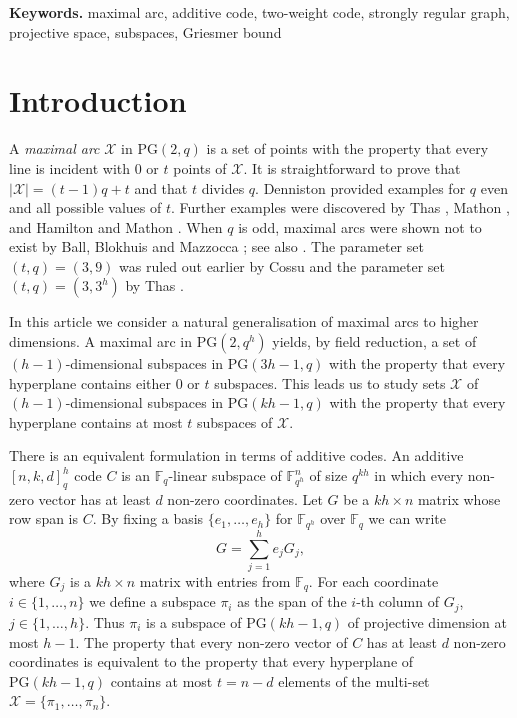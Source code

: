 \documentclass[12pt, twoside]{article}
\def\keywords#1{\par\medskip
	
	\noindent\textbf{Keywords.} #1}
\begin{document}
	\keywords{maximal arc, additive code, two-weight code, strongly regular graph, projective space, subspaces, Griesmer bound}
	
	\section{Introduction}
	
	A {\em maximal arc} $\mathcal{X}$ in $\mathrm{PG}(2,q)$ is a set of points with the property that every line is incident with $0$ or $t$ points of $\mathcal{X}$. It is straightforward to prove that $|\mathcal{X}|=(t-1)q+t$ and that $t$ divides $q$. Denniston \cite{den} provided examples for $q$ even and all possible values of $t$. Further examples were discovered by Thas \cite{tha1,tha3}, Mathon \cite{mathoncon}, and Hamilton and Mathon \cite{HM2003}. When $q$ is odd, maximal arcs were shown not to exist by Ball, Blokhuis and Mazzocca \cite{BBM}; see also \cite{BB}. The parameter set $(t,q)=(3,9)$ was ruled out earlier by Cossu \cite{cos} and the parameter set $(t,q)=(3,3^{h})$ by Thas \cite{tha}.
	
	In this article we consider a natural generalisation of maximal arcs to higher dimensions. A maximal arc in $\mathrm{PG}(2,q^h)$ yields, by field reduction, a set of $(h-1)$-dimensional subspaces in $\mathrm{PG}(3h-1,q)$ with the property that every hyperplane contains either $0$ or $t$ subspaces. This leads us to study sets $\mathcal{X}$ of $(h-1)$-dimensional subspaces in $\mathrm{PG}(kh-1,q)$ with the property that every hyperplane contains at most $t$ subspaces of $\mathcal{X}$.
	
	There is an equivalent formulation in terms of additive codes. An additive $[n,k,d]_{q}^h$ code $C$ is an $\mathbb{F}_q$-linear subspace of $\mathbb{F}_{q^h}^n$ of size $q^{kh}$ in which every non-zero vector has at least $d$ non-zero coordinates. Let $G$ be a $kh \times n$ matrix whose row span is $C$. By fixing a basis $\{e_1,\ldots,e_h\}$ for $\mathbb{F}_{q^h}$ over $\mathbb{F}_q$ we can write
	$$
	G=\sum_{j=1}^h e_jG_j,
	$$
	where $G_j$ is a $kh \times n$ matrix with entries from $\mathbb{F}_q$. For each coordinate $i \in \{1,\ldots,n\}$ we define a subspace $\pi_i$ as the span of the $i$-th column of $G_j$, $j \in \{1,\ldots,h\}$. Thus $\pi_i$ is a subspace of $\mathrm{PG}(kh-1,q)$ of projective dimension at most $h-1$. The property that every non-zero vector of $C$ has at least $d$ non-zero coordinates is equivalent to the property that every hyperplane of $\mathrm{PG}(kh-1,q)$ contains at most $t = n-d$ elements of the multi-set $\mathcal{X} = \{\pi_1,\ldots,\pi_n\}$.
	
\end{document}
